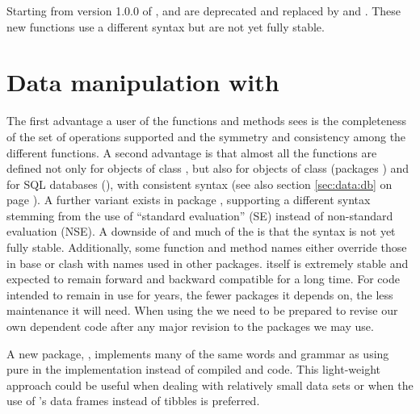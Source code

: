 \documentclass[krantz2]{krantz}\usepackage{knitr}
\begin{document}
\begin{warningbox}
  Starting from version 1.0.0 of ,  and  are deprecated and replaced by  and . These new functions use a different syntax but are not yet fully stable.
\end{warningbox}


\section{Data manipulation with }
\begin{warningbox}
The first advantage a user of the  functions and methods sees is the completeness of the set of operations supported and the symmetry and consistency among the different functions. A second advantage is that almost all the functions are defined not only for objects of class , but also for objects of class  (packages ) and for SQL databases (), with consistent syntax (see also section \ref{sec:data:db} on page \pageref{sec:data:db}). A further variant exists in package , supporting a different syntax stemming from the use of ``standard evaluation'' (SE) instead of non-standard evaluation (NSE). A downside of  and much of the  is that the syntax is not yet fully stable. Additionally, some function and method names either override those in base \Rlang or clash with names used in other packages. \Rlang itself is extremely stable and expected to remain forward and backward compatible for a long time. For code intended to remain in use for years, the fewer packages it depends on, the less maintenance it will need. When using the  we need to be prepared to revise our own dependent code after any major revision to the  packages we may use.
\end{warningbox}

\begin{infobox}
A new package, , implements many of the same words and grammar as  using pure \Rlang in the implementation instead of compiled \Cpplang and \Clang code. This light-weight approach could be useful when dealing with relatively small data sets or when the use of \Rlang's data frames instead of tibbles is preferred.
\end{infobox}
\end{document}
